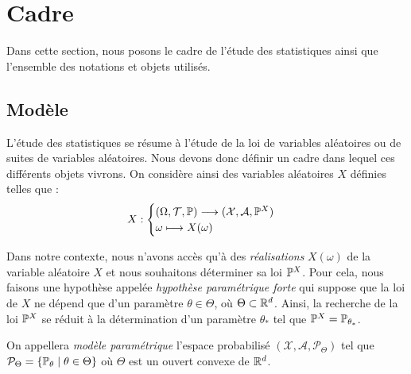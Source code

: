 \minitoc 




\section{Cadre}

Dans cette section, nous posons le cadre de l'étude des statistiques ainsi que l'ensemble 
des notations et objets utilisés. 

\subsection{Modèle}


L'étude des statistiques se résume à l'étude de la loi de variables aléatoires ou de suites de 
variables aléatoires. Nous devons donc définir un cadre dans lequel ces différents objets vivrons. 
On considère ainsi des variables aléatoires $X$ définies telles que : 
\begin{equation}
    X : 
        \begin{cases}
            ( \Omega, \mathcal{T}, \mathbb{P}) \longrightarrow (\mathcal{X}, \mathcal{A}, \mathbb{P}^X) \\ 
            \omega \longmapsto X( \omega)
        \end{cases}    
\end{equation}

Dans notre contexte, nous n'avons accès qu'à des \emph{réalisations} $X( \omega)$ de la variable 
aléatoire $X$ et nous souhaitons déterminer sa loi $ \mathbb{P}^X$. 
Pour cela, nous faisons une hypothèse appelée \emph{hypothèse paramétrique forte} qui suppose que 
la loi de $X$ ne dépend que d'un paramètre $ \theta \in \Theta$, où $ \Theta \subset \mathbb{R}^d$. 
Ainsi, la recherche de la loi $ \mathbb{P}^X$ se réduit à la détermination d'un paramètre $ \theta_*$ tel 
que $ \mathbb{P}^X = \mathbb{P}_{\theta_*}$. 

\begin{definition}
    On appellera \emph{modèle paramétrique} l'espace probabilisé $( \mathcal{X}, \mathcal{A}, \mathcal{P}_\Theta)$ 
    tel que $ \mathcal{P}_\Theta = \{ \mathbb{P}_\theta \mid \theta \in \Theta\}$ où $ \Theta$ est un ouvert convexe 
    de $ \mathbb{R}^d$. 
\end{definition}

